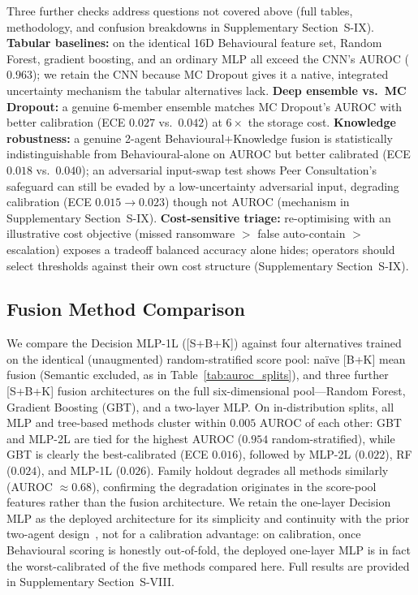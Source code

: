 \documentclass[journal]{IEEEtran}
\begin{document}
Three further checks address questions not covered above (full tables,
methodology, and confusion breakdowns in Supplementary Section~S-IX).
\textbf{Tabular baselines:} on the identical 16D Behavioural feature set,
Random Forest, gradient boosting, and an ordinary MLP all exceed the CNN's
AUROC ($0.963$); we retain the CNN because MC Dropout gives it a native,
integrated uncertainty mechanism the tabular alternatives lack.
\textbf{Deep ensemble vs.\ MC Dropout:} a genuine 6-member ensemble
matches MC Dropout's AUROC with better calibration (ECE $0.027$ vs.\
$0.042$) at $6\times$ the storage cost. \textbf{Knowledge robustness:} a
genuine 2-agent Behavioural+Knowledge fusion is statistically
indistinguishable from Behavioural-alone on AUROC but better calibrated
(ECE $0.018$ vs.\ $0.040$); an adversarial input-swap test shows Peer
Consultation's safeguard can still be evaded by a low-uncertainty
adversarial input, degrading calibration (ECE $0.015{\to}0.023$) though
not AUROC (mechanism in Supplementary Section~S-IX).
\textbf{Cost-sensitive triage:} re-optimising with an illustrative cost
objective (missed ransomware $>$ false auto-contain $>$ escalation)
exposes a tradeoff balanced accuracy alone hides; operators should select
thresholds against their own cost structure (Supplementary
Section~S-IX).

\subsection{Fusion Method Comparison}\label{sec:results_fusion_compare}

We compare the Decision MLP-1L ([S+B+K]) against four alternatives trained
on the identical (unaugmented) random-stratified score pool: na\"{i}ve
[B+K] mean fusion (Semantic excluded, as in Table~\ref{tab:auroc_splits}),
and three further [S+B+K] fusion architectures on the full six-dimensional
pool---Random Forest, Gradient Boosting (GBT), and a two-layer MLP.
On in-distribution splits, all MLP and tree-based methods cluster within
$0.005$ AUROC of each other: GBT and MLP-2L are tied for the highest
AUROC ($0.954$ random-stratified), while GBT is clearly the
best-calibrated (ECE $0.016$), followed by MLP-2L ($0.022$), RF
($0.024$), and MLP-1L ($0.026$). Family holdout degrades all methods
similarly (AUROC $\approx 0.68$), confirming the degradation originates
in the score-pool features rather than the fusion architecture. We retain
the one-layer Decision MLP as the deployed architecture for its
simplicity and continuity with the prior two-agent
design~\cite{kabuye2026sabre}, not for a calibration advantage: on
calibration, once Behavioural scoring is honestly out-of-fold, the
deployed one-layer MLP is in fact the worst-calibrated of the five
methods compared here. Full results are provided in Supplementary
Section~S-VIII.
\end{document}
